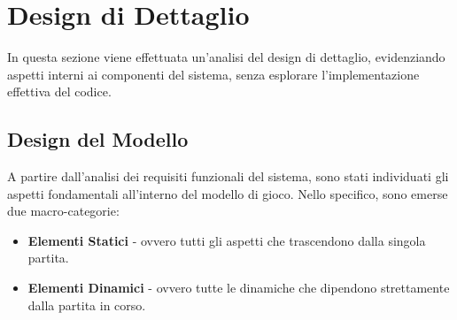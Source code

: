 \section{Design di Dettaglio}
\label{sec:detailed-design}
In questa sezione viene effettuata un'analisi del design di dettaglio, evidenziando aspetti interni ai componenti del
sistema, senza esplorare l'implementazione effettiva del codice.

\subsection{Design del Modello}
A partire dall'analisi dei requisiti funzionali del sistema, sono stati individuati gli aspetti fondamentali all'interno
del modello di gioco. Nello specifico, sono emerse due macro-categorie:
\begin{itemize}
    \item \textbf{Elementi Statici} - ovvero tutti gli aspetti che trascendono dalla singola partita.
    \item \textbf{Elementi Dinamici} - ovvero tutte le dinamiche che dipendono strettamente dalla partita in corso.
\end{itemize}

